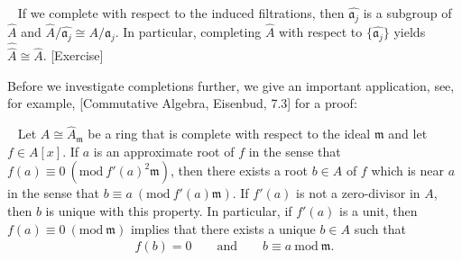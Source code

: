\documentclass[12pt,a4paper,footinclude=true,headinclude=true]{scrbook} %
\newenvironment{theorem}[2][]
{\renewcommand\theinnercustomthm{#2}\innercustomthm[#1]
\begin{mdframed}[backgroundcolor=yellow!20]\ }
{\end{mdframed}\endinnercustomthm}
\newenvironment{corollary}[2][]
{\renewcommand\theinnercustomcol{#2}\innercustomcol[#1]
\begin{mdframed}[backgroundcolor=gray!20]\ }
{\end{mdframed}\endinnercustomcol}
\begin{document}
\begin{corollary}{237}
    If we complete with respect to the induced filtrations, then $\widehat{\mathfrak{a}_j}$ is a subgroup of $\widehat{A}$ and $\widehat{A}/\widehat{\mathfrak{a}_j}\cong A/\mathfrak{a}_j$. In particular, completing $\widehat{A}$ with respect to $\{\widehat{\mathfrak{a}_j}\}$ yields $\widehat{\widehat{A}}\cong\widehat{A}$. [Exercise]
\end{corollary}
\newpage
Before we investigate completions further, we give an important application, see, for example, [Commutative Algebra, Eisenbud, 7.3] for a proof:
\begin{theorem}{238. (Hensel's Lemma Ver. I)}
    \newline Let $A\cong\widehat{A}_\mathfrak{m}$ be a ring that is complete with respect to the ideal $\mathfrak{m}$ and let $f\in A[x]$. If $a$ is an approximate root of $f$ in the sense that $f(a)\equiv0\ (\mathrm{mod}\ f'(a)^2\mathfrak{m})$, then there exists a root $b\in A$ of $f$ which is near $a$ in the sense that $b\equiv a\ (\mathrm{mod}\ f'(a)\mathfrak{m})$. If $f'(a)$ is not a zero-divisor in $A$, then $b$ is unique with this property. In particular, if $f'(a)$ is a unit, then $f(a)\equiv0\ (\mathrm{mod}\ \mathfrak{m})$ implies that there exists a unique $b\in A$ such that
    \begin{align*}
        f(b)=0\qquad\text{and}\qquad b\equiv a\ \mathrm{mod}\ \mathfrak{m}.
    \end{align*}
\end{theorem}
\end{document}
